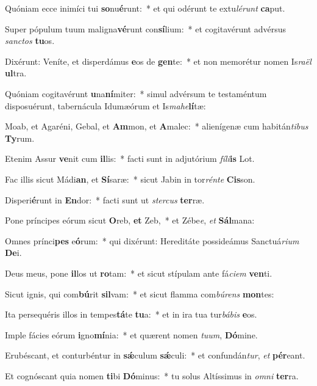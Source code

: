 \item Quóniam ecce inimíci tui \textbf{so}nu\textbf{é}runt:~* et qui odérunt te extu\textit{lé}\textit{runt} \textbf{ca}put.
\item Super pópulum tuum maligna\textbf{vé}runt con\textbf{sí}lium:~* et cogitavérunt advérsus \textit{sanc}\textit{tos} \textbf{tu}os.
\item Dixérunt: Veníte, et disperdámus \textbf{e}os de \textbf{gen}te:~* et non memorétur nomen Is\textit{ra}\textit{ël} \textbf{ul}tra.
\item Quóniam cogitavérunt \textbf{u}na\textbf{ní}miter:~* simul advérsum te testaméntum disposuérunt, tabernácula Idumæórum et Is\textit{ma}\textit{he}\textbf{lí}tæ:
\item Moab, et Agaréni, Gebal, et \textbf{Am}mon, et \textbf{A}malec:~* alienígenæ cum habitán\textit{ti}\textit{bus} \textbf{Ty}rum.
\item Etenim Assur \textbf{ve}nit cum \textbf{il}lis:~* facti sunt in adjutórium \textit{fí}\textit{li}\textbf{is} Lot.
\item Fac illis sicut Mádi\textbf{an}, et \textbf{Sí}saræ:~* sicut Jabin in tor\textit{rén}\textit{te} \textbf{Cis}son.
\item Disperi\textbf{é}runt in \textbf{En}dor:~* facti sunt ut \textit{ster}\textit{cus} \textbf{ter}ræ.
\item Pone príncipes eórum sicut \textbf{O}reb, \textbf{et} Zeb,~* et Zébe\textit{e}, \textit{et} \textbf{Sál}mana:
\item Omnes prínci\textbf{pes} e\textbf{ó}rum:~* qui dixérunt: Hereditáte possideámus Sanctuá\textit{ri}\textit{um} \textbf{De}i.
\item Deus meus, pone \textbf{il}los ut \textbf{ro}tam:~* et sicut stípulam ante fá\textit{ci}\textit{em} \textbf{ven}ti.
\item Sicut ignis, qui com\textbf{bú}rit \textbf{sil}vam:~* et sicut flamma com\textit{bú}\textit{rens} \textbf{mon}tes:
\item Ita persequéris illos in tempes\textbf{tá}te \textbf{tu}a:~* et in ira tua tur\textit{bá}\textit{bis} \textbf{e}os.
\item Imple fácies eórum \textbf{i}gno\textbf{mí}nia:~* et quærent nomen \textit{tu}\textit{um}, \textbf{Dó}mine.
\item Erubéscant, et conturbéntur in \textbf{sǽ}culum \textbf{sǽ}culi:~* et confundán\textit{tur}, \textit{et} \textbf{pér}eant.
\item Et cognóscant quia nomen \textbf{ti}bi \textbf{Dó}minus:~* tu solus Altíssimus in \textit{om}\textit{ni} \textbf{ter}ra.
